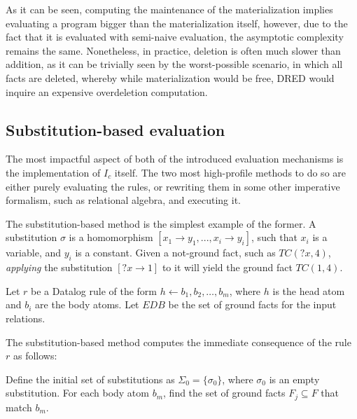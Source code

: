 \documentclass[sigconf,screen,review,natbib]{acmart}
\theoremstyle{definition}
\begin{document}
As it can be seen, computing the maintenance of the materialization implies evaluating a program bigger than the
materialization itself, however, due to the fact that it is evaluated with semi-naive evaluation, the asymptotic
complexity remains the same. Nonetheless, in practice, deletion is often much slower than addition, as it can be
trivially seen by the worst-possible scenario, in which all facts are deleted, whereby while materialization would
be free, DRED would inquire an expensive overdeletion computation.

\subsection{Substitution-based evaluation}
The most impactful aspect of both of the introduced evaluation mechanisms is the implementation
of $I_c$ itself. The two most high-profile methods to do so are either purely evaluating the rules, or
rewriting them in some other imperative formalism, such as relational algebra, and executing it.

The substitution-based\cite{datalog} method is the simplest example of the former. A substitution $\sigma$ is
a homomorphism $[x_1 \rightarrow y_1, ..., x_i \rightarrow y_i]$, such that $x_i$ is a variable, and $y_i$ is
a constant. Given a not-ground fact, such as $TC(?x, 4)$, \textit{applying} the substitution $[?x \rightarrow 1]$ to
it will yield the ground fact $TC(1, 4)$.

Let $r$ be a Datalog rule of the form $h \leftarrow b_1, b_2, \ldots, b_m$, where $h$ is the head atom and $b_i$ are
the body atoms. Let $EDB$ be the set of ground facts for the input relations.

The substitution-based method computes the immediate consequence of the rule $r$ as follows:

Define the initial set of substitutions as $\Sigma_0 = \{ \sigma_0 \}$, where $\sigma_0$ is an empty substitution. For
each body atom $b_m$, find the set of ground facts $F_j \subseteq F$ that match $b_m$.
\end{document}
